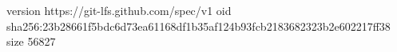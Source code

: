 version https://git-lfs.github.com/spec/v1
oid sha256:23b28661f5bdc6d73ea61168df1b35af124b93fcb2183682323b2e602217ff38
size 56827
